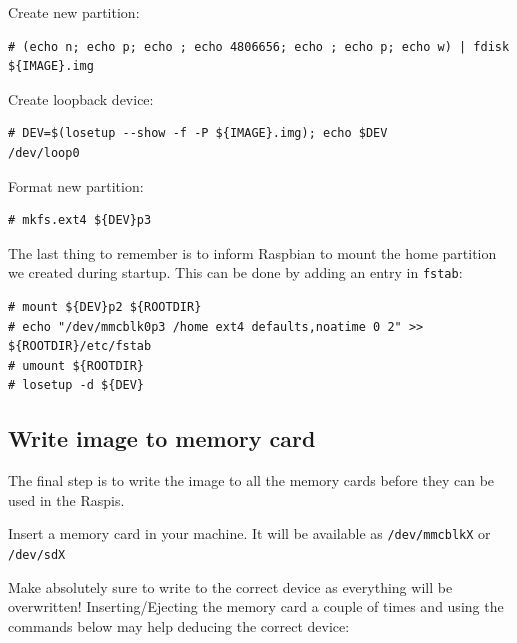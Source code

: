 Create new partition:

\begin{lstlisting}[]
# (echo n; echo p; echo ; echo 4806656; echo ; echo p; echo w) | fdisk ${IMAGE}.img
\end{lstlisting}
\FloatBarrier
\vspace{-5mm}

Create loopback device: 
\begin{lstlisting}[]
# DEV=$(losetup --show -f -P ${IMAGE}.img); echo $DEV
/dev/loop0
\end{lstlisting}
\FloatBarrier
\vspace{-5mm}

Format new partition:
\begin{lstlisting}[]
# mkfs.ext4 ${DEV}p3
\end{lstlisting}
\FloatBarrier
\vspace{-5mm}

The last thing to remember is to inform Raspbian to mount the home partition
we created during startup. This can be done by adding an entry in \texttt{fstab}:
\begin{lstlisting}[]
# mount ${DEV}p2 ${ROOTDIR}
# echo "/dev/mmcblk0p3 /home ext4 defaults,noatime 0 2" >> ${ROOTDIR}/etc/fstab
# umount ${ROOTDIR}
# losetup -d ${DEV}
\end{lstlisting}
\FloatBarrier
\vspace{-5mm}


\subsection{Write image to memory card}

The final step is to write the image to all the memory cards before they can
be used in the \ac{Raspi}s.



Insert a memory card in your machine. It will be available as
\texttt{/dev/mmcblkX} or \texttt{/dev/sdX}

Make absolutely sure to write to the correct device as everything will be 
overwritten!
Inserting/Ejecting the memory card a couple of times and using the commands
below may help deducing the correct device:

